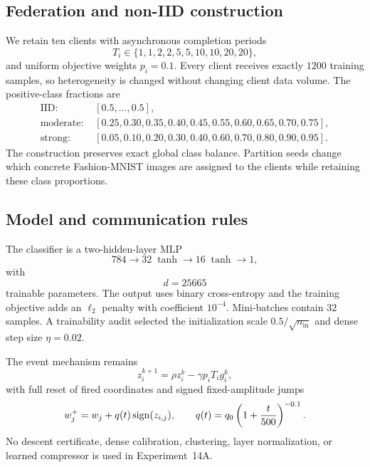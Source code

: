 \subsection{Federation and non-IID construction}

We retain ten clients with asynchronous completion periods
\begin{equation}
T_i\in\{1,1,2,2,5,5,10,10,20,20\},
\end{equation}
and uniform objective weights $p_i=0.1$. Every client receives exactly $1200$ training samples, so heterogeneity is changed without changing client data volume. The positive-class fractions are
\begin{align}
\text{IID: }&[0.5,\ldots,0.5],\\
\text{moderate: }&[0.25,0.30,0.35,0.40,0.45,0.55,0.60,0.65,0.70,0.75],\\
\text{strong: }&[0.05,0.10,0.20,0.30,0.40,0.60,0.70,0.80,0.90,0.95].
\end{align}
The construction preserves exact global class balance. Partition seeds change which concrete Fashion-MNIST images are assigned to the clients while retaining these class proportions.

\subsection{Model and communication rules}

The classifier is a two-hidden-layer MLP
\begin{equation}
784\rightarrow 32\;\tanh\rightarrow16\;\tanh\rightarrow1,
\end{equation}
with
\begin{equation}
\boxed{d=25665}
\end{equation}
trainable parameters. The output uses binary cross-entropy and the training objective adds an $\ell_2$ penalty with coefficient $10^{-4}$. Mini-batches contain $32$ samples. A trainability audit selected the initialization scale $0.5/\sqrt{n_{\mathrm{in}}}$ and dense step size $\eta=0.02$.

The event mechanism remains
\begin{equation}
z_i^{k+1}=\rho z_i^k-\gamma p_iT_i g_i^k,
\end{equation}
with full reset of fired coordinates and signed fixed-amplitude jumps
\begin{equation}
w_j^+=w_j+q(t)\operatorname{sign}(z_{i,j}),\qquad
q(t)=q_0\left(1+\frac{t}{500}\right)^{-0.1}.
\end{equation}
No descent certificate, dense calibration, clustering, layer normalization, or learned compressor is used in Experiment~14A.

